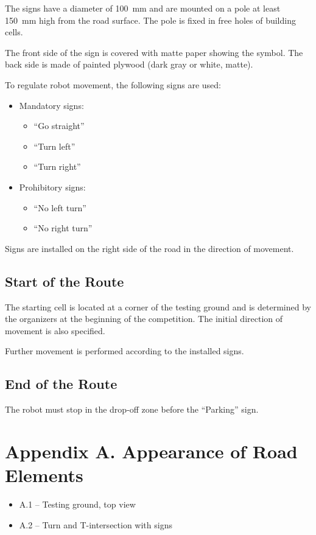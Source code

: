 \documentclass[a4paper,12pt]{article}
\begin{document}
The signs have a diameter of 100~mm and are mounted on a pole at least 150~mm high from the road surface. The pole is fixed in free holes of building cells.

The front side of the sign is covered with matte paper showing the symbol. The back side is made of painted plywood (dark gray or white, matte).

To regulate robot movement, the following signs are used:

\begin{itemize}
\item Mandatory signs:
\begin{itemize}
\item ``Go straight''
\item ``Turn left''
\item ``Turn right''
\end{itemize}
\item Prohibitory signs:
\begin{itemize}
\item ``No left turn''
\item ``No right turn''
\end{itemize}
\end{itemize}

Signs are installed on the right side of the road in the direction of movement.

\subsection{Start of the Route}

The starting cell is located at a corner of the testing ground and is determined by the organizers at the beginning of the competition. The initial direction of movement is also specified.

Further movement is performed according to the installed signs.

\subsection{End of the Route}

The robot must stop in the drop-off zone before the ``Parking'' sign.

\section*{Appendix A. Appearance of Road Elements}

\begin{itemize}
\item A.1 -- Testing ground, top view
\item A.2 -- Turn and T-intersection with signs
\end{itemize}
\end{document}
